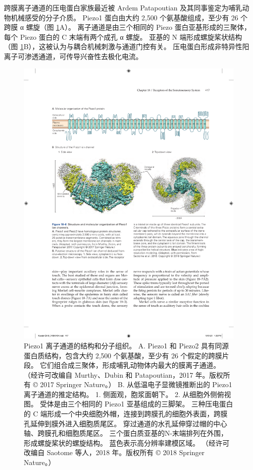 跨膜离子通道的压电蛋白家族最近被 Ardem Patapoutian 及其同事鉴定为哺乳动物机械感受的分子介质。 
Piezo1 蛋白由大约 2,500 个氨基酸组成，至少有 26 个跨膜 α 螺旋（图 \ref{fig:18_6}A）。 
离子通道是由三个相同的 Piezo 蛋白亚基形成的三聚体，每个 Piezo 蛋白的 C 末端有两个成孔 α 螺旋。 
亚基的 N 端形成螺旋桨状结构（图 \ref{fig:18_6}B），这被认为与耦合机械刺激与通道门控有关。 
压电蛋白形成非特异性阳离子可渗透通道，可传导兴奋性去极化电流。

\begin{figure}[htbp]
	\centering
	\includegraphics[width=1.0\linewidth]{chap18/fig_18_6}
	\caption{Piezo1 离子通道的结构和分子组织。 
		A. Piezo1 和 Piezo2 具有同源蛋白质结构，包含大约 2,500 个氨基酸，至少有 26 个假定的跨膜片段。 
		它们组合成三聚体，形成哺乳动物体内最大的膜离子通道。 （经许可改编自 Murthy、Dubin 和 Patapoutian，2017 年。版权所有 © 2017 Springer Nature。）
		B. 从低温电子显微镜推断出的 Piezo1 离子通道的推定结构。 
		1. 侧面观，胞浆面朝下。 
		2. 从细胞外侧俯视图。 
		受体是由三个相同的 Piezo1 亚基组成的三脚架。 
		三种压电蛋白的 C 端形成一个中央细胞外帽，连接到跨膜孔的细胞外表面，跨膜孔延伸到膜外进入细胞质尾区。 
		穿过通道的水孔延伸穿过帽的中心轴、跨膜孔和细胞质尾区。 
		三个蛋白质亚基的N-末端排列在外围，形成螺旋桨状的螺旋结构。 
		蓝色表示高分辨率建模区域。 （经许可改编自 Saotome 等人，2018 年。版权所有 © 2018 Springer Nature。）}
	\label{fig:18_6}
\end{figure}



